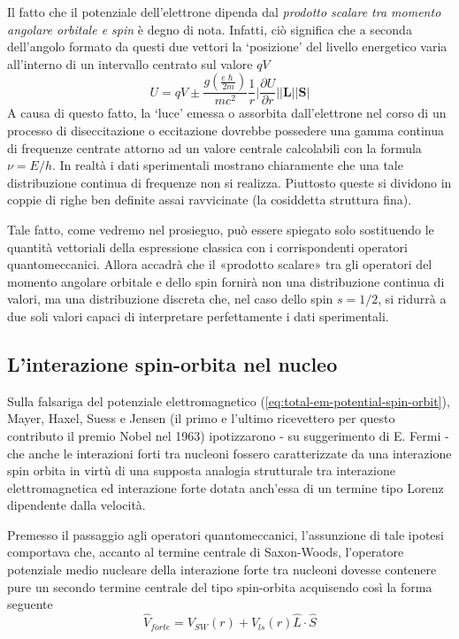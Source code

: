 Il fatto che il potenziale dell’elettrone dipenda dal \emph{prodotto scalare tra momento angolare orbitale e spin} è degno di nota. Infatti, ciò significa che a seconda dell’angolo formato da questi due vettori la ‘posizione’ del livello energetico varia all’interno di un intervallo centrato sul valore $qV$
\[
U = qV \pm \frac{g \left( \frac{e\hslash}{2m} \right)}{m c^{2}} \frac{1}{r} \bigg| \frac{ \partial U }{ \partial r }  \bigg| \bigg|\bm{L}  \bigg|  \bigg|\bm{S} \bigg|
\]
A causa di questo fatto, la ‘luce’ emessa o assorbita dall’elettrone nel corso di un processo di diseccitazione o eccitazione dovrebbe possedere una gamma continua di frequenze centrate attorno ad un valore centrale calcolabili con la formula $\nu = E / h$.
In realtà i dati sperimentali mostrano chiaramente che una tale distribuzione continua di frequenze non si realizza. Piuttosto queste si dividono in coppie di righe ben definite assai ravvicinate (la cosiddetta struttura fina).

Tale fatto, come vedremo nel prosieguo, può essere spiegato solo sostituendo le quantità vettoriali della espressione classica con i corrispondenti operatori quantomeccanici. Allora accadrà che il «prodotto scalare» tra gli operatori del momento angolare orbitale e dello spin fornirà non una distribuzione continua di valori, ma una distribuzione discreta che, nel caso dello spin $s=1/2$, si ridurrà a due soli valori capaci di interpretare perfettamente i dati sperimentali.

\subsection{L'interazione spin-orbita nel nucleo}\label{sec:spin-orbit-interaction-nucleus}

Sulla falsariga del potenziale elettromagnetico (\ref{eq:total-em-potential-spin-orbit}), Mayer, Haxel, Suess e Jensen (il primo e l’ultimo ricevettero per questo contributo il premio Nobel nel 1963) ipotizzarono - su suggerimento di E. Fermi - che anche le interazioni forti tra nucleoni fossero caratterizzate da una interazione spin orbita in virtù di una supposta analogia strutturale tra interazione elettromagnetica ed interazione forte dotata anch’essa di un termine tipo Lorenz dipendente dalla velocità.
\bigskip

Premesso il passaggio agli operatori quantomeccanici, l’assunzione di tale ipotesi comportava che, accanto al termine centrale di Saxon-Woods, l’operatore potenziale medio nucleare della interazione forte tra nucleoni dovesse contenere pure un secondo termine centrale del tipo spin-orbita acquisendo così la forma seguente
\begin{equation}
	\boxed{\hat{V}_{forte} = V_{SW}(r) + V_{ls}(r) \hat{L} \cdot  \hat{S}}
	\label{eq:mean-nuclear-potential-operator}
\end{equation}

